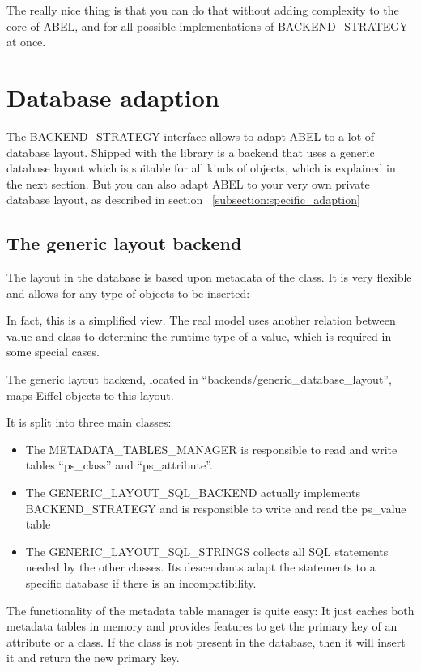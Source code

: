 The really nice thing is that you can do that without adding complexity to the core of ABEL, and for all possible implementations of BACKEND\_STRATEGY at once.


\section{Database adaption}

The BACKEND\_STRATEGY interface allows to adapt ABEL to a lot of database layout.
Shipped with the library is a backend that uses a generic database layout which is suitable for all kinds of objects, which is explained in the next section.
But you can also adapt ABEL to your very own private database layout, as described in section ~\ref{subsection:specific_adaption}

\subsection{The generic layout backend}

The layout in the database is based upon metadata of the class. It is very flexible and allows for any type of objects to be inserted:


In fact, this is a simplified view. 
The real model uses another relation between value and class to determine the runtime type of a value, which is required in some special cases.

The generic layout backend, located in ``backends/generic\_database\_layout'', maps Eiffel objects to this layout.

It is split into three main classes:
\begin{itemize}
 \item The METADATA\_TABLES\_MANAGER is responsible to read and write tables ``ps\_class'' and ``ps\_attribute''.
 \item The GENERIC\_LAYOUT\_SQL\_BACKEND actually implements BACKEND\_STRATEGY and is responsible to write and read the ps\_value table
 \item The GENERIC\_LAYOUT\_SQL\_STRINGS collects all SQL statements needed by the other classes. Its descendants adapt the statements to a specific database if there is an incompatibility.
\end{itemize}

The functionality of the metadata table manager is quite easy:
It just caches both metadata tables in memory and provides features to get the primary key of an attribute or a class.
If the class is not present in the database, then it will insert it and return the new primary key.

